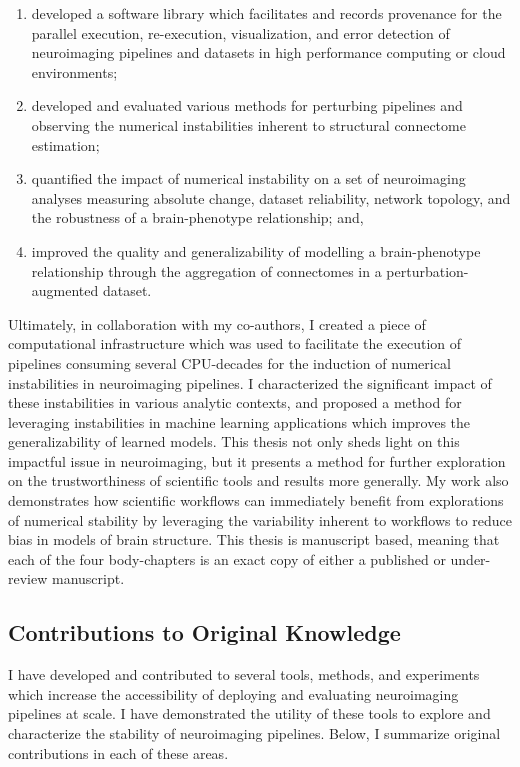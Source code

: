 \begin{enumerate}[label=(\roman*)]
\item developed a software library which facilitates and records provenance for the parallel execution,
re-execution, visualization, and error detection of neuroimaging pipelines and datasets in high performance computing or cloud environments;
\item developed and evaluated various methods for perturbing pipelines and observing the numerical instabilities
inherent to structural connectome estimation;
\item quantified the impact of numerical instability on a set of neuroimaging analyses measuring absolute change,
dataset reliability, network topology, and the robustness of a brain-phenotype relationship; and,
\item improved the quality and generalizability of modelling a brain-phenotype relationship through the aggregation of
connectomes in a perturbation-augmented dataset.
\end{enumerate}

Ultimately, in collaboration with my co-authors, I created a piece of computational infrastructure which was used to
facilitate the execution of pipelines consuming several CPU-decades for the induction of numerical instabilities in
neuroimaging pipelines. I characterized the significant impact of these instabilities in various analytic contexts, and
proposed a method for leveraging instabilities in machine learning applications which improves the generalizability of
learned models. This thesis not only sheds light on this impactful issue in neuroimaging, but it presents a method for
further exploration on the trustworthiness of scientific tools and results more generally. My work also demonstrates
how scientific workflows can immediately benefit from explorations of numerical stability by leveraging the variability
inherent to workflows to reduce bias in models of brain structure. This thesis is manuscript based, meaning that each
of the four body-chapters is an exact copy of either a published or under-review manuscript.

\subsection{Contributions to Original Knowledge}
I have developed and contributed to several tools, methods, and experiments which increase the accessibility of
deploying and evaluating neuroimaging pipelines at scale. I have demonstrated the utility of these tools to explore and
characterize the stability of neuroimaging pipelines. Below, I summarize original contributions in each of these areas.

